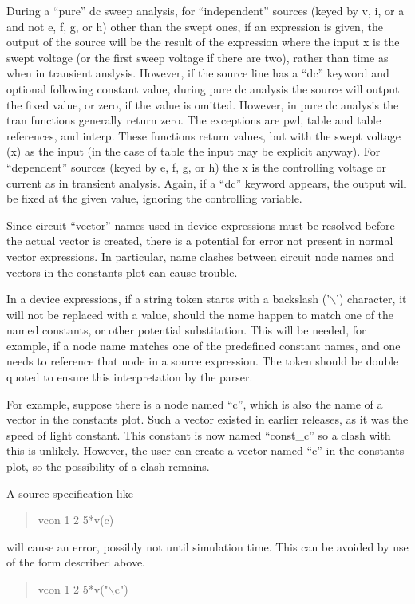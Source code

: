 During a ``pure'' dc sweep analysis, for ``independent'' sources
(keyed by {\vt v}, {\vt i}, or {\vt a} and not {\vt e}, {\vt f}, {\vt
g}, or {\vt h}) other than the swept ones, if an expression is given,
the output of the source will be the result of the expression where
the input {\vt x} is the swept voltage (or the first sweep voltage if
there are two), rather than time as when in transient anslysis. 
However, if the source line has a ``dc'' keyword and optional
following constant value, during pure dc analysis the source will
output the fixed value, or zero, if the value is omitted.  However, in
pure dc analysis the tran functions generally return zero.  The
exceptions are {\vt pwl}, {\vt table} and table references, and {\vt
interp}.  These functions return values, but with the swept voltage
({\vt x}) as the input (in the case of {\vt table} the input may be
explicit anyway).  For ``dependent'' sources (keyed by {\vt e}, {\vt
f}, {\vt g}, or {\vt h}) the {\vt x} is the controlling voltage or
current as in transient analysis.  Again, if a ``dc'' keyword appears,
the output will be fixed at the given value, ignoring the controlling
variable.

Since circuit ``vector'' names used in device expressions must be
resolved before the actual vector is created, there is a potential for
error not present in normal vector expressions.  In particular, name
clashes between circuit node names and vectors in the {\vt constants}
plot can cause trouble.

In a device expressions, if a string token starts with a backslash
('$\backslash$') character, it will not be replaced with a value,
should the name happen to match one of the named constants, or other
potential substitution.  This will be needed, for example, if a node
name matches one of the predefined constant names, and one needs to
reference that node in a source expression.  The token should be
double quoted to ensure this interpretation by the parser.

For example, suppose there is a node named ``{\vt c}'', which is also
the name of a vector in the {\vt constants} plot.  Such a vector
existed in earlier {\WRspice} releases, as it was the speed of
light constant.  This constant is now named ``{\vt const\_c}'' so a
clash with this is unlikely.  However, the user can create a vector
named ``{\vt c}'' in the {\vt constants} plot, so the possibility of a
clash remains.

A source specification like
\begin{quote}\vt
vcon 1 2 5*v(c)
\end{quote}
will cause an error, possibly not until simulation time.  This
can be avoided by use of the form described above.
\begin{quote}\vt
vcon 1 2 5*v("$\backslash$c")
\end{quote}

